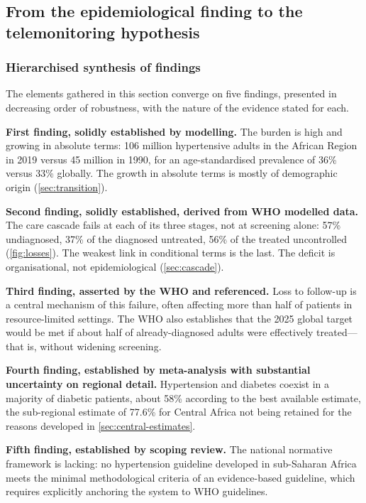 \documentclass[12pt,a4paper,oneside]{report}
\begin{document}
\subsection{From the epidemiological finding to the telemonitoring hypothesis}\label{sec:hypothesis}

\subsubsection{Hierarchised synthesis of findings}

The elements gathered in this section converge on five findings, presented in decreasing order of robustness, with the nature of the evidence stated for each.

\textbf{First finding, solidly established by modelling.} The burden is high and growing in absolute terms: 106 million hypertensive adults in the African Region in 2019 versus 45 million in 1990, for an age-standardised prevalence of 36\% versus 33\% globally. The growth in absolute terms is mostly of demographic origin (\cref{sec:transition}).

\textbf{Second finding, solidly established, derived from WHO modelled data.} The care cascade fails at each of its three stages, not at screening alone: 57\% undiagnosed, 37\% of the diagnosed untreated, 56\% of the treated uncontrolled (\cref{fig:losses}). The weakest link in conditional terms is the last. The deficit is organisational, not epidemiological (\cref{sec:cascade}).

\textbf{Third finding, asserted by the WHO and referenced.} Loss to follow-up is a central mechanism of this failure, often affecting more than half of patients in resource-limited settings. The WHO also establishes that the 2025 global target would be met if about half of already-diagnosed adults were effectively treated---that is, without widening screening.

\textbf{Fourth finding, established by meta-analysis with substantial uncertainty on regional detail.} Hypertension and diabetes coexist in a majority of diabetic patients, about 58\% according to the best available estimate, the sub-regional estimate of 77.6\% for Central Africa not being retained for the reasons developed in \cref{sec:central-estimates}.

\textbf{Fifth finding, established by scoping review.} The national normative framework is lacking: no hypertension guideline developed in sub-Saharan Africa meets the minimal methodological criteria of an evidence-based guideline, which requires explicitly anchoring the system to WHO guidelines.
\end{document}
